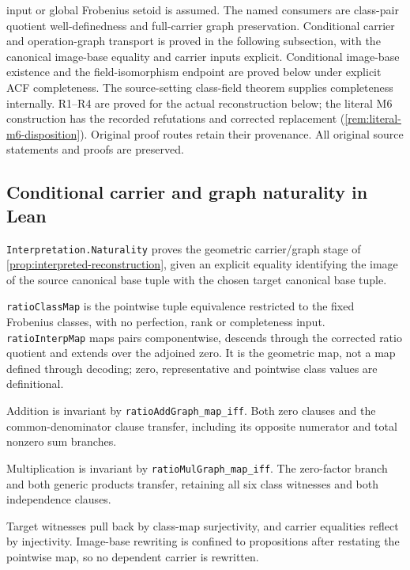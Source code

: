 \documentclass[11pt,oneside]{article}
\theoremstyle{definition}
\theoremstyle{remark}
\newcommand{\lean}[1]{\nolinkurl{#1}}
\begin{document}
input or global Frobenius setoid is assumed. The named consumers are class-pair quotient
well-definedness and full-carrier graph preservation.
Conditional carrier and operation-graph transport is proved in the following subsection,
with the canonical image-base equality and carrier inputs explicit. Conditional image-base
existence and the field-isomorphism endpoint are proved below under explicit ACF completeness.
The source-setting class-field theorem supplies completeness internally. R1--R4 are
proved for the actual reconstruction below; the literal M6 construction has the recorded
refutations and corrected replacement (\cref{rem:literal-m6-disposition}). Original proof
routes retain their provenance.
All original source statements and proofs are preserved.

\subsection{Conditional carrier and graph naturality in Lean}

\lean{Interpretation.Naturality} proves the geometric carrier/graph stage of
\cref{prop:interpreted-reconstruction}, given an explicit equality identifying the image
of the source canonical base tuple with the chosen target canonical base tuple.

\lean{ratioClassMap} is the pointwise tuple equivalence restricted to the fixed
Frobenius classes, with no perfection, rank or completeness input.
\lean{ratioInterpMap} maps pairs componentwise, descends through the corrected ratio
quotient and extends over the adjoined zero. It is the geometric map, not a map defined
through decoding; zero, representative and pointwise class values are definitional.

Addition is invariant by \lean{ratioAddGraph_map_iff}.
Both zero clauses and the common-denominator clause transfer, including its opposite
numerator and total nonzero sum branches.

Multiplication is invariant by \lean{ratioMulGraph_map_iff}.
The zero-factor branch and both generic products transfer, retaining all six class
witnesses and both independence clauses.

Target witnesses pull back by class-map surjectivity, and carrier equalities reflect
by injectivity. Image-base rewriting is confined to propositions after restating the
pointwise map, so no dependent carrier is rewritten.
\end{document}
